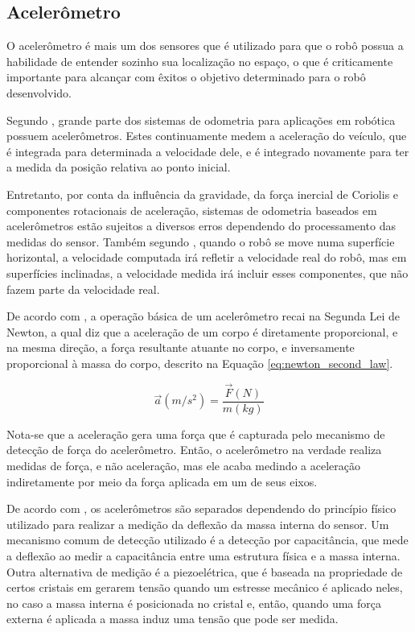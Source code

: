 \documentclass[acronym, symbols, table]{fei}
\begin{document}
			\subsection{Acelerômetro} \label{sec:sensores_acelerometro}
			
				O acelerômetro é mais um dos sensores que é utilizado para que o robô possua a habilidade de entender sozinho sua localização no espaço, o que é criticamente importante para alcançar com êxitos o objetivo determinado para o robô desenvolvido.
			
				Segundo \textcite{NISTLER2011413}, grande parte dos sistemas de odometria para aplicações em robótica possuem acelerômetros. Estes continuamente medem a aceleração do veículo, que é integrada para determinada a velocidade dele, e é integrado novamente para ter a medida da posição relativa ao ponto inicial.
				
				Entretanto, por conta da influência da gravidade, da força inercial de Coriolis \cite{persson1998we} e componentes rotacionais de aceleração, sistemas de odometria baseados em acelerômetros estão sujeitos a diversos erros dependendo do processamento das medidas do sensor. Também segundo \textcite{NISTLER2011413}, quando o robô se move numa superfície horizontal, a velocidade computada irá refletir a velocidade real do robô, mas em superfícies inclinadas, a velocidade medida irá incluir esses componentes, que não fazem parte da velocidade real.
			
				De acordo com \textcite{dadafshar2014accelerometer}, a operação básica de um acelerômetro recai na Segunda Lei de Newton, a qual diz que a aceleração de um corpo é diretamente proporcional, e na mesma direção, a força resultante atuante no corpo, e inversamente proporcional à massa do corpo, descrito na Equação \ref{eq:newton_second_law}.
				
				\begin{equation}\label{eq:newton_second_law}
					\overrightarrow{a}(m/s^2) = \frac{\overrightarrow{F}(N)}{m(kg)}
				\end{equation}
			
				Nota-se que a aceleração gera uma força que é capturada pelo mecanismo de detecção de força do acelerômetro. Então, o acelerômetro na verdade realiza medidas de força, e não aceleração, mas ele acaba medindo a aceleração indiretamente por meio da força aplicada em um de seus eixos.
				
				De acordo com \textcite{siegwart2011introduction}, os acelerômetros são separados dependendo do princípio físico utilizado para realizar a medição da deflexão da massa interna do sensor. Um mecanismo comum de detecção utilizado é a detecção por capacitância, que mede a deflexão ao medir a capacitância entre uma estrutura física e a massa interna. Outra alternativa de medição é a piezoelétrica, que é baseada na propriedade de certos cristais em gerarem tensão quando um estresse mecânico é aplicado neles, no caso a massa interna é posicionada no cristal e, então, quando uma força externa é aplicada a massa induz uma tensão que pode ser medida.
				
\end{document}
